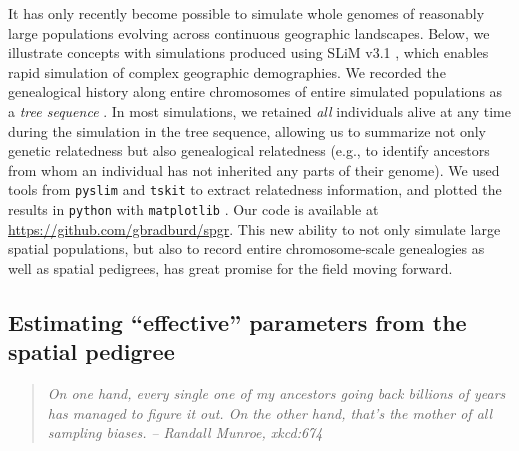 \documentclass{ar-1col}
\newcommand{\g}[1]{{\color{blue}{#1}}}
\renewcommand{\emph}[1]{{\textit{#1}}}
\begin{document}
It has only recently become possible to simulate whole genomes
of reasonably large populations
evolving across continuous geographic landscapes.
Below, 
we illustrate concepts with 
simulations 
produced using SLiM v3.1 \citep{haller2018forward},
which enables rapid simulation of complex geographic demographies.
We recorded the genealogical history along entire chromosomes
of entire simulated populations
as a \emph{tree sequence} \citep{haller2018treesequence}.
In most simulations, we retained \emph{all} individuals alive at any time during the simulation
in the tree sequence, allowing us to summarize not only genetic relatedness
but also genealogical relatedness 
(e.g., to identify ancestors from whom an individual has not inherited any parts of their genome).
We used tools from \texttt{pyslim} and \texttt{tskit} \citep{kelleher2018efficient} 
to extract relatedness information,
and plotted the results in \texttt{python} with \texttt{matplotlib} \citep{hunter2007matplotlib}.
\g{We maintained stable local densities by increasing mortality in regions of high density,
and chose parameter values with relatively strong spatial structure
(dispersal distance between 1 and 4 units of distance 
and mean population density 5 individuals per unit area).}
Our code is available at \url{https://github.com/gbradburd/spgr}.
This new ability to not only simulate large spatial populations,
but also to record entire chromosome-scale genealogies as well as spatial pedigrees,
has great promise for the field moving forward.


\subsection{Estimating ``effective'' parameters from the spatial pedigree}

\begin{quote}
    \textit{
    On one hand, every single one of my ancestors going back billions of years
    has managed to figure it out.
    On the other hand, that's the mother of all sampling biases.}
    \hfill \textit{-- Randall Munroe, xkcd:674}
\end{quote}
\end{document}
